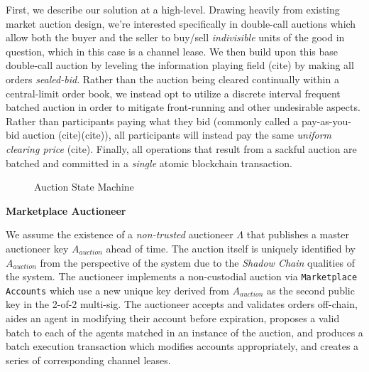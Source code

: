 \documentclass[12pt,a4paper]{article}
\theoremstyle{definition}
\begin{document}
First, we describe our solution at a high-level. Drawing heavily from existing
market auction design, we're interested specifically in double-call auctions
which allow both the buyer and the seller to buy/sell \emph{indivisible} units
of the good in question, which in this case is a channel lease. We then build
upon this base double-call auction by leveling the information playing field
(cite) by making all orders \emph{sealed-bid}. Rather than the auction being
cleared continually within a central-limit order book, we instead opt to
utilize a discrete interval frequent batched auction in order to mitigate
front-running and other undesirable aspects. Rather than participants paying
what they bid (commonly called a pay-as-you-bid auction (cite)(cite)), all
participants will instead pay the same \emph{uniform clearing price} (cite).
Finally, all operations that result from a sackful auction are batched and
committed in a \emph{single} atomic blockchain transaction.

\clearpage

\begin{figure}[!htb]


\caption{Auction State Machine}

\end{figure}


\begin{center}
    \textbf{Marketplace Auctioneer}
\end{center}

We assume the existence of a \emph{non-trusted} auctioneer $\Lambda$ that
publishes a master auctioneer key $A_{auction}$ ahead of time. The auction
itself is uniquely identified by $A_{auction}$ from the perspective of the
system due to the \emph{Shadow Chain} qualities of the system. The auctioneer
implements a non-custodial auction via \texttt{Marketplace Accounts} which use
a new unique key derived from $A_{auction}$ as the second public key in the
2-of-2 multi-sig. The auctioneer accepts and validates orders off-chain, aides
an agent in modifying their account before expiration, proposes a valid batch
to each of the agents matched in an instance of the auction, and produces a
batch execution transaction which modifies accounts appropriately, and creates
a series of corresponding channel leases.
\end{document}
